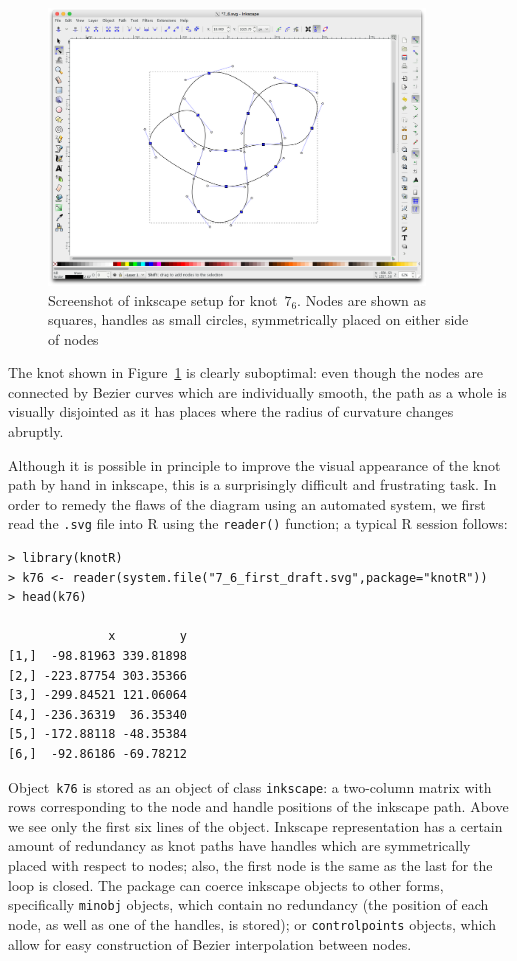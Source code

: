 \documentclass{birkjour}
\theoremstyle{definition}
\theoremstyle{remark}
\numberwithin{equation}{section}
\begin{document}
\begin{figure}[h]
  \centering
    \includegraphics[width=10cm]{screenshot_inkscape_7_6.png}
\caption{Screenshot of inkscape\label{screenshot_inkscape_7_6} setup
  for knot~$7_6$.  Nodes are shown as squares, handles as small
  circles, symmetrically placed on either side of nodes}
\end{figure}

The knot shown in Figure~\ref{screenshot_inkscape_7_6} is clearly
suboptimal: even though the nodes are connected by Bezier curves which
are individually smooth, the path as a whole is visually disjointed as
it has places where the radius of curvature changes abruptly.

Although it is possible in principle to improve the visual appearance
of the knot path by hand in inkscape, this is a surprisingly difficult
and frustrating task.  In order to remedy the flaws of the diagram
using an automated system, we first read the {\tt .svg} file into R
using the {\tt reader()} function; a typical R session follows:

\begin{verbatim}
> library(knotR)
> k76 <- reader(system.file("7_6_first_draft.svg",package="knotR"))
> head(k76)

              x         y
[1,]  -98.81963 339.81898
[2,] -223.87754 303.35366
[3,] -299.84521 121.06064
[4,] -236.36319  36.35340
[5,] -172.88118 -48.35384
[6,]  -92.86186 -69.78212
\end{verbatim}

Object~{\tt k76} is stored as an object of class {\tt inkscape}: a
two-column matrix with rows corresponding to the node and handle
positions of the inkscape path.  Above we see only the first six lines
of the object.  Inkscape representation has a certain amount of
redundancy as knot paths have handles which are symmetrically placed
with respect to nodes; also, the first node is the same as the last
for the loop is closed.  The package can coerce inkscape objects to
other forms, specifically {\tt minobj} objects, which contain no
redundancy (the position of each node, as well as one of the handles,
is stored); or {\tt controlpoints} objects, which allow for easy
construction of Bezier interpolation between nodes.
\end{document}
